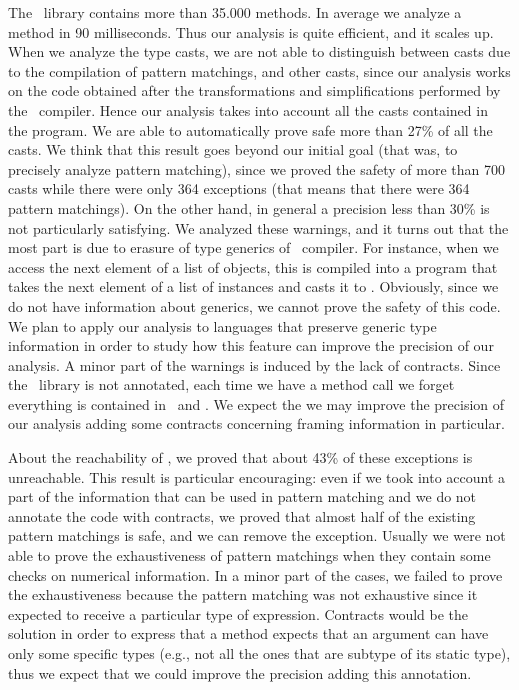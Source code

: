 \documentclass{llncs}
\begin{document}
The \Scala\ library contains more than 35.000 methods. In average we analyze a method in 90 milliseconds. Thus our analysis is quite efficient, and it scales up. When we analyze the type casts, we are not able to distinguish between casts due to the compilation of pattern matchings, and other casts, since our analysis works on the code obtained after the transformations and simplifications performed by the \Scala\ compiler. Hence our analysis takes into account all the casts contained in the program. We are able to automatically prove safe more than 27\% of all the casts. We think that this result goes beyond our initial goal (that was, to precisely analyze pattern matching), since we proved the safety of more than 700 casts while there were only 364  exceptions (that means that there were 364 pattern matchings). On the other hand, in general a precision less than 30\% is not particularly satisfying. We analyzed these warnings, and it turns out that the most part is due to erasure of type generics of \Scala\ compiler. For instance, when we access the next element of a list of  objects, this is compiled into a program that takes the next element of a list of  instances and casts it to . Obviously, since we do not have information about generics, we cannot prove the safety of this code. We plan to apply our analysis to languages that preserve generic type information in order to study how this feature can improve the precision of our analysis. A minor part of the warnings is induced by the lack of contracts. Since the \Scala\ library is not annotated, each time we have a method call we forget everything is contained in \dynamictype\ and \nottype. We expect the we may improve the precision of our analysis adding some contracts concerning framing information in particular.

About the reachability of , we proved that about 43\% of these exceptions is unreachable. This result is particular encouraging: even if we took into account a part of the information that can be used in pattern matching and we do not annotate the code with contracts, we proved that almost half of the existing pattern matchings is safe, and we can remove the  exception. Usually we were not able to prove the exhaustiveness of pattern matchings when they contain some checks on numerical information. In a minor part of the cases, we failed to prove the exhaustiveness  because the pattern matching was not exhaustive since it expected to receive a particular type of expression. Contracts would be the solution in order to express that a method expects that an argument can have only some specific types (e.g., not all the ones that are subtype of its static type), thus we expect that we could improve the precision adding this annotation.
\end{document}
